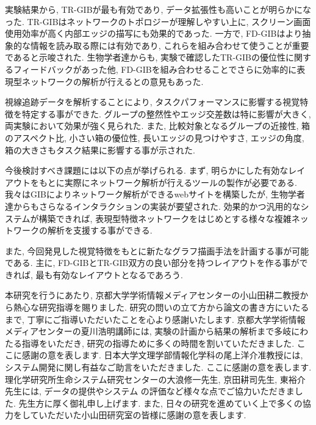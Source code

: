 \documentclass{kuee}
\begin{document}
実験結果から, TR-GIBが最も有効であり, データ拡張性も高いことが明らかになった.
TR-GIBはネットワークのトポロジーが理解しやすい上に, スクリーン画面使用効率が高く内部エッジの描写にも効果的であった.
一方で, FD-GIBはより抽象的な情報を読み取る際には有効であり, これらを組み合わせて使うことが重要であると示唆された.
生物学者達からも, 実験で確認したTR-GIBの優位性に関するフィードバックがあった他, FD-GIBを組み合わせることでさらに効率的に表現型ネットワークの解析が行えるとの意見もあった.

視線追跡データを解析することにより, タスクパフォーマンスに影響する視覚特徴を特定する事ができた.
グループの整然性やエッジ交差数は特に影響が大きく, 両実験において効果が強く見られた.
また, 比較対象となるグループの近接性, 箱のアスペクト比, 小さい箱の優位性, 長いエッジの見つけやすさ, エッジの角度, 箱の大きさもタスク結果に影響する事が示された.

今後検討すべき課題には以下の点が挙げられる.
まず, 明らかにした有効なレイアウトをもとに実際にネットワーク解析が行えるツールの製作が必要である.
我々はGIBによりネットワーク解析ができるwebサイトを構築したが, 生物学者達からもさらなるインタラクションの実装が要望された.
効果的かつ汎用的なシステムが構築できれば, 表現型特徴ネットワークをはじめとする様々な複雑ネットワークの解析を支援する事ができる.

また, 今回発見した視覚特徴をもとに新たなグラフ描画手法を計画する事が可能である.
主に, FD-GIBとTR-GIB双方の良い部分を持つレイアウトを作る事ができれば, 最も有効なレイアウトとなるであろう.



\begin{acknowledgements}
  本研究を行うにあたり, 京都大学学術情報メディアセンターの小山田耕二教授から熱心な研究指導を賜りました.
  研究の問いの立て方から論文の書き方にいたるまで, 丁寧にご指導いただいたことを心より感謝いたします.
  京都大学学術情報メディアセンターの夏川浩明講師には, 実験の計画から結果の解析まで多岐にわたる指導をいただき, 研究の指導ために多くの時間を割いていただきました.
  ここに感謝の意を表します.
  日本大学文理学部情報化学科の尾上洋介准教授には, システム開発に関し有益なご助言をいただきました.
  ここに感謝の意を表します.
  理化学研究所生命システム研究センターの大浪修一先生, 京田耕司先生, 東裕介先生には, データの提供やシステム
  の評価など様々な点でご協力いただきました.
  先生方に厚く御礼申し上げます.
  また, 日々の研究を進めていく上で多くの協力をしていただいた小山田研究室の皆様に感謝の意を表します.
\end{acknowledgements}
\end{document}
